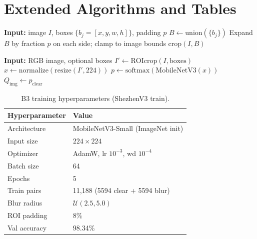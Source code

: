 \section{Extended Algorithms and Tables}
\label{sec:app-extended}

\begin{algorithm}[h]
\caption{COCO ROI crop (union + padding)}
\begin{algorithmic}[1]
\STATE \textbf{Input:} image $I$, boxes $\{b_j=[x,y,w,h]\}$, padding $p$
\STATE $B \leftarrow \mathrm{union}(\{b_j\})$
\STATE Expand $B$ by fraction $p$ on each side; clamp to image bounds
\STATE \RETURN $\mathrm{crop}(I, B)$
\end{algorithmic}
\end{algorithm}

\begin{algorithm}[h]
\caption{B3 inference (MobileNetV3-Small)}
\begin{algorithmic}[1]
\STATE \textbf{Input:} RGB image, optional boxes
\STATE $I' \leftarrow \mathrm{ROIcrop}(I,\mathrm{boxes})$
\STATE $x \leftarrow \mathrm{normalize}(\mathrm{resize}(I', 224))$
\STATE $p \leftarrow \mathrm{softmax}(\mathrm{MobileNetV3}(x))$
\STATE \RETURN $Q_{\mathrm{img}} \leftarrow p_{\mathrm{clear}}$
\end{algorithmic}
\end{algorithm}

\begin{table}[h]
\centering
\caption{B3 training hyperparameters (ShezhenV3 train).}
\label{tab:b3-hparams}
\small
\begin{tabular}{ll}
\hline
Hyperparameter & Value \\
\hline
Architecture & MobileNetV3-Small (ImageNet init) \\
Input size & $224\times224$ \\
Optimizer & AdamW, lr $10^{-3}$, wd $10^{-4}$ \\
Batch size & 64 \\
Epochs & 5 \\
Train pairs & 11{,}188 (5594 clear + 5594 blur) \\
Blur radius & $\mathcal{U}(2.5, 5.0)$ \\
ROI padding & 8\% \\
Val accuracy & 98.34\% \\
\hline
\end{tabular}
\end{table}

